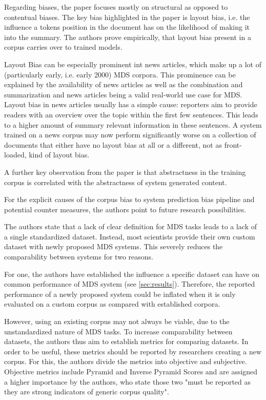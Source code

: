 \documentclass[20_original-paper.tex]{subfiles}
\begin{document}

Regarding biases, the paper focuses mostly on structural as opposed to contentual biases.
The key bias highlighted in the paper is layout bias, i.e. the influence a tokens position in the document has on the likelihood of making it into the summary.
The authors prove empirically, that layout bias present in a corpus carries over to trained models.

Layout Bias can be especially prominent int news articles, which make up a lot of (particularly early, i.e. early 2000) MDS corpora.
This prominence can be explained by the availability of news articles as well as the combination and summarization and news articles being a valid real-world use case for MDS.
Layout bias in news articles usually has a simple cause: reporters aim to provide readers with an overview over the topic within the first few sentences.
This leads to a higher amount of summary relevant information in these sentences.
A system trained on a news corpus may now perform significantly worse on a collection of documents that either have no layout bias at all or a different, not as front-loaded, kind of layout bias.

A further key observation from the paper is that abstractness in the training corpus is correlated with the abstractness of system generated content.

For the explicit causes of the corpus bias to system prediction bias pipeline and potential counter measures, the authors point to future research possibilities.

The authors state that a lack of clear definition for MDS tasks leads to a lack of a single standardized dataset.
Instead, most scientists provide their own custom dataset with newly proposed MDS systems.
This severely reduces the comparability between systems for two reasons.

For one, the authors have established the influence a specific dataset can have on common performance of MDS system (see \ref{sec:results}). Therefore, the reported performance of a newly proposed system could be inflated when it is only evaluated on a custom corpus as compared with established corpora.

However, using an existing corpus may not always be viable, due to the unstandardized nature of MDS tasks.
To increase comparability between datasets, the authors thus aim to establish metrics for comparing datasets.
In order to be useful, these metrics should be reported by researchers creating a new corpus.
For this, the authors divide the metrics into objective and subjective.
Objective metrics include Pyramid and Inverse Pyramid Scores and are assigned a higher importance by the authors, who state those two "must be
reported as they are strong indicators of generic corpus quality"\cite{dey-etal-2020-corpora}.
\end{document}
